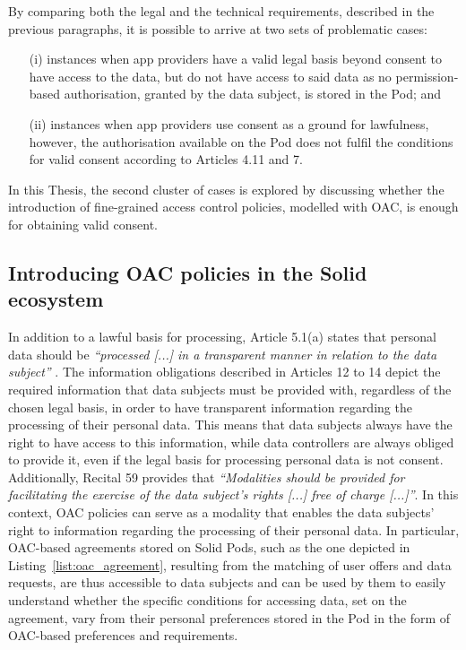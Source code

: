 By comparing both the legal and the technical requirements, described in the previous paragraphs, it is possible to arrive at two sets of problematic cases:
\begin{itemize}
    \item[(i)] instances when app providers have a valid legal basis beyond consent to have access to the data, but do not have access to said data as no permission-based authorisation, granted by the data subject, is stored in the Pod; and
    \item[(ii)] instances when app providers use consent as a ground for lawfulness, however, the authorisation available on the Pod does not fulfil the conditions for valid consent according to Articles 4.11 and 7.
\end{itemize}

In this Thesis, the second cluster of cases is explored by discussing whether the introduction of fine-grained access control policies, modelled with OAC, is enough for obtaining valid consent.

\subsection{Introducing OAC policies in the Solid ecosystem} %
\label{sec:oac_notice_automation}

In addition to a lawful basis for processing, Article 5.1(a) states that personal data should be \textit{``processed [...] in a transparent manner in relation to the data subject''} \citeyearpar{noauthor_regulation_2016}.
The information obligations described in Articles 12 to 14 depict the required information that data subjects must be provided with, regardless of the chosen legal basis, in order to have transparent information regarding the processing of their personal data.
This means that data subjects always have the right to have access to this information, while data controllers are always obliged to provide it, even if the legal basis for processing personal data is not consent.
Additionally, Recital 59 provides that \textit{``Modalities should be provided for facilitating the exercise of the data subject’s rights [...] free of charge [...]''}.
In this context, OAC policies can serve as a modality that enables the data subjects' right to information regarding the processing of their personal data.
In particular, OAC-based agreements stored on Solid Pods, such as the one depicted in Listing~\ref{list:oac_agreement}, resulting from the matching of user offers and data requests,  are thus accessible to data subjects and can be used by them to easily understand whether the specific conditions for accessing data, set on the agreement, vary from their personal preferences stored in the Pod in the form of OAC-based preferences and requirements.

